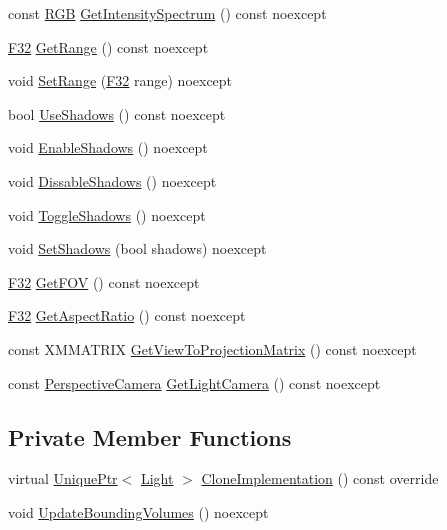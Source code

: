 \begin{DoxyCompactItemize}
\item 
const \hyperlink{structmage_1_1_r_g_b}{R\+GB} \hyperlink{classmage_1_1_omni_light_a89ce7086bd33e1d419dbd755316daf2e}{Get\+Intensity\+Spectrum} () const noexcept
\item 
\hyperlink{namespacemage_aa97e833b45f06d60a0a9c4fc22ae02c0}{F32} \hyperlink{classmage_1_1_omni_light_a1c829777c2afc850dd66382bc0115d8d}{Get\+Range} () const noexcept
\item 
void \hyperlink{classmage_1_1_omni_light_a696ec6a022ccc3993d88c1d435938fb1}{Set\+Range} (\hyperlink{namespacemage_aa97e833b45f06d60a0a9c4fc22ae02c0}{F32} range) noexcept
\item 
bool \hyperlink{classmage_1_1_omni_light_a8d58e7e1b26e54b3d9785ca79213cc4f}{Use\+Shadows} () const noexcept
\item 
void \hyperlink{classmage_1_1_omni_light_ad7c2e780dc83eb63fa44e1475492e192}{Enable\+Shadows} () noexcept
\item 
void \hyperlink{classmage_1_1_omni_light_a2353a53e336ffb55be9949ea6f1d8979}{Dissable\+Shadows} () noexcept
\item 
void \hyperlink{classmage_1_1_omni_light_a19164a13e884bce6fbc80b760c82d243}{Toggle\+Shadows} () noexcept
\item 
void \hyperlink{classmage_1_1_omni_light_a337082a4e6026fe6f98098df063e6660}{Set\+Shadows} (bool shadows) noexcept
\item 
\hyperlink{namespacemage_aa97e833b45f06d60a0a9c4fc22ae02c0}{F32} \hyperlink{classmage_1_1_omni_light_a7a0bd82c0272a7eeeb33a9ede796bae1}{Get\+F\+OV} () const noexcept
\item 
\hyperlink{namespacemage_aa97e833b45f06d60a0a9c4fc22ae02c0}{F32} \hyperlink{classmage_1_1_omni_light_a976a37c3f7c160f0383a93e4f7497eed}{Get\+Aspect\+Ratio} () const noexcept
\item 
const X\+M\+M\+A\+T\+R\+IX \hyperlink{classmage_1_1_omni_light_a3efda1559769189e4693c6e3c570ab4b}{Get\+View\+To\+Projection\+Matrix} () const noexcept
\item 
const \hyperlink{classmage_1_1_perspective_camera}{Perspective\+Camera} \hyperlink{classmage_1_1_omni_light_ac31708d7696a809bb75c75a85b14de80}{Get\+Light\+Camera} () const noexcept
\end{DoxyCompactItemize}
\subsection*{Private Member Functions}
\begin{DoxyCompactItemize}
\item 
virtual \hyperlink{namespacemage_a3316d7143a973e37adf1110f2e80ca31}{Unique\+Ptr}$<$ \hyperlink{classmage_1_1_light}{Light} $>$ \hyperlink{classmage_1_1_omni_light_a1212457828cdd96cc7170767b7bd1223}{Clone\+Implementation} () const override
\item 
void \hyperlink{classmage_1_1_omni_light_a6a10cdc0ed276d68e5378eaf934158e1}{Update\+Bounding\+Volumes} () noexcept
\end{DoxyCompactItemize}

